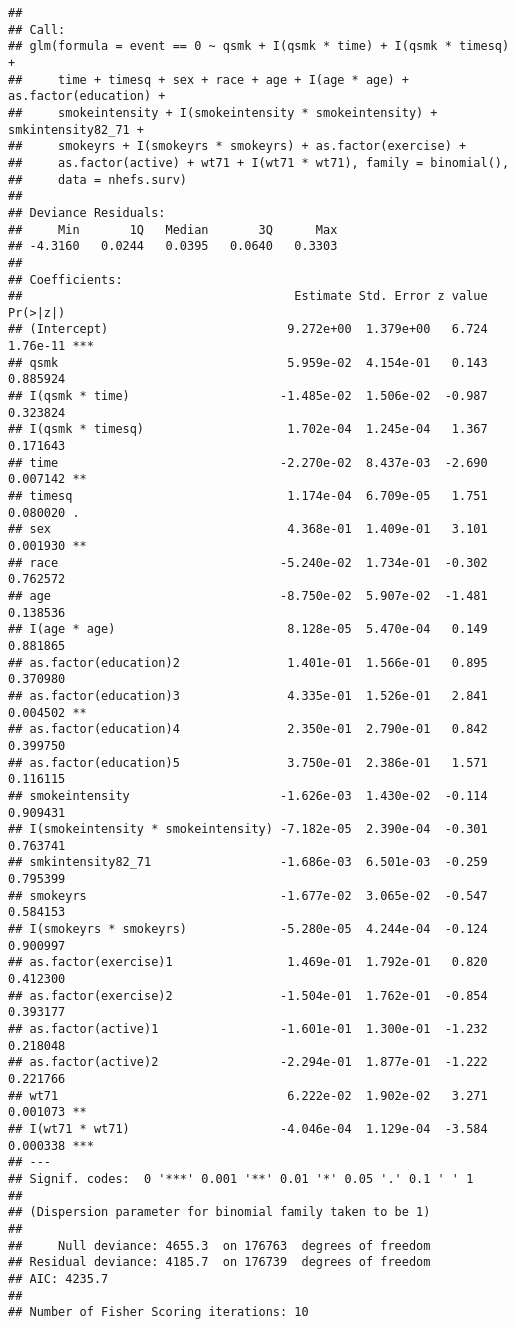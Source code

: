 \documentclass[
  10pt,
]{book}
\begin{document}
\begin{verbatim}
## 
## Call:
## glm(formula = event == 0 ~ qsmk + I(qsmk * time) + I(qsmk * timesq) + 
##     time + timesq + sex + race + age + I(age * age) + as.factor(education) + 
##     smokeintensity + I(smokeintensity * smokeintensity) + smkintensity82_71 + 
##     smokeyrs + I(smokeyrs * smokeyrs) + as.factor(exercise) + 
##     as.factor(active) + wt71 + I(wt71 * wt71), family = binomial(), 
##     data = nhefs.surv)
## 
## Deviance Residuals: 
##     Min       1Q   Median       3Q      Max  
## -4.3160   0.0244   0.0395   0.0640   0.3303  
## 
## Coefficients:
##                                      Estimate Std. Error z value Pr(>|z|)    
## (Intercept)                         9.272e+00  1.379e+00   6.724 1.76e-11 ***
## qsmk                                5.959e-02  4.154e-01   0.143 0.885924    
## I(qsmk * time)                     -1.485e-02  1.506e-02  -0.987 0.323824    
## I(qsmk * timesq)                    1.702e-04  1.245e-04   1.367 0.171643    
## time                               -2.270e-02  8.437e-03  -2.690 0.007142 ** 
## timesq                              1.174e-04  6.709e-05   1.751 0.080020 .  
## sex                                 4.368e-01  1.409e-01   3.101 0.001930 ** 
## race                               -5.240e-02  1.734e-01  -0.302 0.762572    
## age                                -8.750e-02  5.907e-02  -1.481 0.138536    
## I(age * age)                        8.128e-05  5.470e-04   0.149 0.881865    
## as.factor(education)2               1.401e-01  1.566e-01   0.895 0.370980    
## as.factor(education)3               4.335e-01  1.526e-01   2.841 0.004502 ** 
## as.factor(education)4               2.350e-01  2.790e-01   0.842 0.399750    
## as.factor(education)5               3.750e-01  2.386e-01   1.571 0.116115    
## smokeintensity                     -1.626e-03  1.430e-02  -0.114 0.909431    
## I(smokeintensity * smokeintensity) -7.182e-05  2.390e-04  -0.301 0.763741    
## smkintensity82_71                  -1.686e-03  6.501e-03  -0.259 0.795399    
## smokeyrs                           -1.677e-02  3.065e-02  -0.547 0.584153    
## I(smokeyrs * smokeyrs)             -5.280e-05  4.244e-04  -0.124 0.900997    
## as.factor(exercise)1                1.469e-01  1.792e-01   0.820 0.412300    
## as.factor(exercise)2               -1.504e-01  1.762e-01  -0.854 0.393177    
## as.factor(active)1                 -1.601e-01  1.300e-01  -1.232 0.218048    
## as.factor(active)2                 -2.294e-01  1.877e-01  -1.222 0.221766    
## wt71                                6.222e-02  1.902e-02   3.271 0.001073 ** 
## I(wt71 * wt71)                     -4.046e-04  1.129e-04  -3.584 0.000338 ***
## ---
## Signif. codes:  0 '***' 0.001 '**' 0.01 '*' 0.05 '.' 0.1 ' ' 1
## 
## (Dispersion parameter for binomial family taken to be 1)
## 
##     Null deviance: 4655.3  on 176763  degrees of freedom
## Residual deviance: 4185.7  on 176739  degrees of freedom
## AIC: 4235.7
## 
## Number of Fisher Scoring iterations: 10
\end{verbatim}
\end{document}
